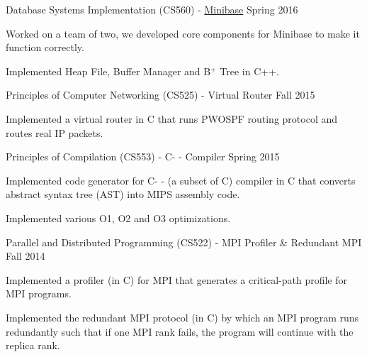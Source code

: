 

\begin{cventries}

  \cvcoursework
    {Database Systems Implementation (CS560)
    - \href{http://research.cs.wisc.edu/coral/mini_doc/minibase.html}{Minibase}} %
    {Spring 2016} %
    {
      \begin{cvitems} %
        \item {Worked on a team of two, we developed core components
    for Minibase to make it function correctly.}
       \item {Implemented Heap File, Buffer Manager and B$^+$ Tree in C++.}
      \end{cvitems}
    }


  \cvcoursework
    {Principles of Computer Networking (CS525) - Virtual Router}
    {Fall 2015} %
    {
      \begin{cvitems} %
        \item {Implemented a virtual router in C that runs PWOSPF routing protocol
    and routes real IP packets.}
      \end{cvitems}
    }


  \cvcoursework
    {Principles of Compilation (CS553) - C- - Compiler}
    {Spring 2015} %
    {
      \begin{cvitems} %
        \item {Implemented code generator for C- - (a subset
    of C) compiler in C that converts abstract syntax tree (AST) into
    MIPS assembly code.}
        \item {Implemented various O1, O2 and O3 optimizations.}
      \end{cvitems}
    }

  \cvcoursework
    {Parallel and Distributed Programming (CS522) - MPI Profiler \& Redundant MPI}
    {Fall 2014} %
    {
      \begin{cvitems} %
        \item {Implemented a profiler (in C) for MPI that generates a
    critical-path profile for MPI programs.}
        \item {Implemented the redundant MPI protocol (in C) by which
    an MPI program runs redundantly such that if one MPI rank fails,
    the program will continue with the replica rank.}
      \end{cvitems}
    }


\end{cventries}
